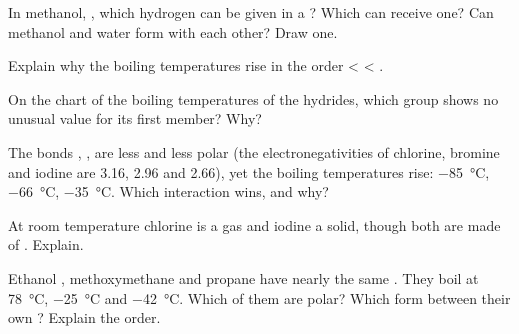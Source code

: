 \begin{exercise}[$\star\star$]\label{exo:g11:polarity-and-cohesion:7}
In methanol, , which hydrogen  can be given in a ? Which  can receive one? Can methanol and water  form
 with each other? Draw one.
\end{exercise}

\begin{exercise}[$\star\star$]\label{exo:g11:polarity-and-cohesion:8}
Explain why the boiling temperatures rise in the order  <
 < .
\end{exercise}

\begin{exercise}[$\star\star$]\label{exo:g11:polarity-and-cohesion:9}
On the chart of the boiling temperatures of the hydrides, which group
shows no unusual value for its first member? Why?
\end{exercise}

\begin{exercise}[$\star\star$]\label{exo:g11:polarity-and-cohesion:10}
The bonds , ,  are less and less polar (the
electronegativities of chlorine, bromine and iodine are 3.16, 2.96 and
2.66), yet the boiling temperatures rise: \qty{-85}{\celsius},
\qty{-66}{\celsius}, \qty{-35}{\celsius}. Which interaction wins, and
why?
\end{exercise}

\begin{exercise}[$\star\star$]\label{exo:g11:polarity-and-cohesion:11}
At room temperature chlorine is a gas and iodine a solid, though both
are made of  . Explain.
\end{exercise}

\begin{exercise}[$\star\star\star$]\label{exo:g11:polarity-and-cohesion:12}
Ethanol , methoxymethane  and propane
 have nearly the same . They boil at
\qty{78}{\celsius}, \qty{-25}{\celsius} and \qty{-42}{\celsius}. Which
of them are polar? Which form  between their own
? Explain the order.
\end{exercise}


